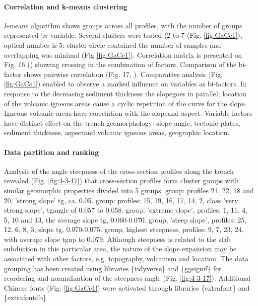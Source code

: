 \documentclass[11pt,a4paper]{report}
\begin{document}
{\paragraph{Correlation and k-means clustering}
\emph{k}-means algorithm shows groups across all profiles, with the number of groups represented by variable. Several clusters were tested (2 to 7 (Fig. \ref{fig:GaCc1}), optical number is 5: cluster circle contained the number of samples and overlapping was minimal (Fig \ref{fig:GaCc1}). Correlation matrix is presented on Fig. 16 (\cite{Lemenkova201991}) showing crossing in the combination of factors. Comparison of the bi-factor shows pairwise correlation (Fig. 17, \cite{Lemenkova201991}). Comparative analysis (Fig. \ref{fig:GaCc1}) enabled to observe a marked influence on variables as bi-factors. In response to the decreasing sediment thickness the slope\degree\space goes in parallel; location of the volcanic igneous areas cause a cyclic repetition of the curve for the slope\degree. Igneous volcanic areas have correlation with the slope\degree\space and aspect\degree. Variable factors have distinct effect on the trench geomorphology: slope angle, tectonic plates, sediment thickness, aspect\degree\space and volcanic igneous areas, geographic location.	

\paragraph{Data partition and ranking}
Analysis of the angle steepness of the cross-section profiles along the trench revealed (Fig. \ref{fig:4-3-17}) that cross-section profiles form cluster groups with similar geomorphic properties divided into 5 groups.  group: profiles 21, 22, 18 and 20, 'strong slope' tg\degree, ca. 0.05.  group: profiles: 15, 19, 16, 17, 14, 2, class 'very strong slope', tg\degree angle of 0.057 to 0.058.  group, 'extreme slope', profiles: 1, 11, 4, 5, 10 and 13, the average slope tg\degree, 0.060-0.070.  group, 'steep slope', profiles: 25, 12, 6, 8, 3, slope tg\degree, 0.070-0.075.  group, highest steepness, profiles: 9, 7, 23, 24, with average slope tg\degree\space up to 0.079. Although steepness is related to the slab subduction in this particular area, the nature of the slope expansion may be associated with other factors, e.g. topography, volcanism and location. The data grouping has been created using libraries \{tidyverse\} and \{ggsignif\} for reordering and normalization of the steepness angle (Fig. \ref{fig:4-3-17}). Additional Chinese fonts (Fig. \ref{fig:GaCc1}) were activated through libraries \{extrafont\} and \{extrafontdb\}

}
\end{document}
